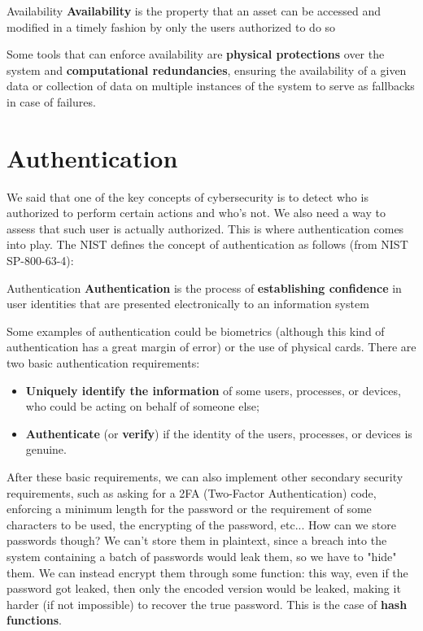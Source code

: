 \begin{definition}{Availability}
    \textbf{Availability} is the property that an asset can be accessed and modified in a timely fashion by only the users authorized to do so
\end{definition}

Some tools that can enforce availability are \textbf{physical protections} over the system and \textbf{computational redundancies}, ensuring the availability of a given data or collection of data on multiple instances of the system to serve as fallbacks in case of failures.


\section{Authentication}

We said that one of the key concepts of cybersecurity is to detect who is authorized to perform certain actions and who's not. We also need a way to assess that such user is actually authorized. This is where authentication comes into play.
\nl
The NIST defines the concept of authentication as follows (from NIST SP-800-63-4):

\begin{definition}{Authentication}
    \textbf{Authentication} is the process of \textbf{establishing confidence} in user identities that are presented electronically to an information system
\end{definition}

Some examples of authentication could be biometrics (although this kind of authentication has a great margin of error) or the use of physical cards. There are two basic authentication requirements:
\begin{itemize}
    \item \textbf{Uniquely identify the information} of some users, processes, or devices, who could be acting on behalf of someone else;
    \item \textbf{Authenticate} (or \textbf{verify}) if the identity of the users, processes, or devices is genuine.
\end{itemize}
\nl
After these basic requirements, we can also implement other secondary security requirements, such as asking for a 2FA (Two-Factor Authentication) code, enforcing a minimum length for the password or the requirement of some characters to be used, the encrypting of the password, etc...
\nl
How can we store passwords though? We can't store them in plaintext, since a breach into the system containing a batch of passwords would leak them, so we have to "hide" them. We can instead encrypt them through some function: this way, even if the password got leaked, then only the encoded version would be leaked, making it harder (if not impossible) to recover the true password. This is the case of \textbf{hash functions}.


